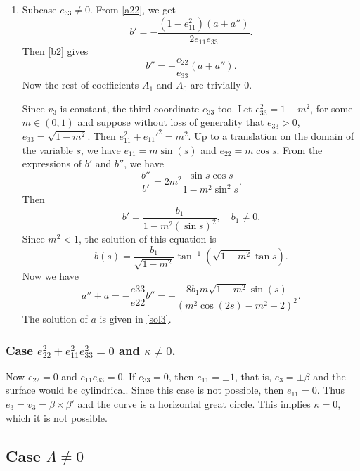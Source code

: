 \documentclass[12pt,a4paper,reqno]{amsart}
\begin{document}
\begin{enumerate}
\begin{enumerate}
\begin{enumerate}
 


\item Subcase $e_{33}\not=0$. From \eqref{a22}, we get 
$$b'=-\frac{(1-e_{11}^2)(a+a'')}{2e_{11}e_{33}}.$$
Then  \eqref{b2} gives
$$b''=-\frac{e_{22}}{e_{33}}(a+a'').$$
Now the rest of coefficients $A_1$ and $A_0$ are trivially $0$. 

Since $v_3$ is constant, the third coordinate $e_{33}$ too. Let $e_{33}^2=1-m^2$, for some $m\in (0,1)$ and suppose without loss of generality that $e_{33}>0$, $e_{33}=\sqrt{1-m^2}$. Then $e_{11}^2+e_{11}'^2=m^2$. Up to a translation on the domain of the variable $s$, we have $e_{11}=m\sin (s)$ and $e_{22}=m\cos s$. From the expressions of $b'$ and $b''$, we have
$$\frac{b''}{b'}=2m^2\frac{\sin s\cos s}{1-m^2\sin^2 s}.$$
Then 
$$b'=\frac{b_1}{1-m^2 (\sin s)^2},\quad  b_1\not=0.$$
Since $m^2<1$, the solution of this equation is  
$$b(s)=\frac{b_1}{\sqrt{1-m^2}}\tan^{-1}(\sqrt{1-m^2}\tan s).$$
Now we have 
$$a''+a=-\frac{e33}{e22}b''=-\frac{8 b_1 m \sqrt{1-m^2} \sin (s)}{\left(m^2 \cos (2 s)-m^2+2\right)^2}.$$
The solution of $a$ is given in   \eqref{sol3}. 

\end{enumerate}
 

 
\end{enumerate}
\end{enumerate}

\subsubsection{ Case $e_{22}^2+e_{11}^2e_{33}^2=0$ and $\kappa\not=0$.}

Now $e_{22}=0$ and $e_{11}e_{33}=0$. If $e_{33}=0$, then $e_{11}=\pm 1$, that is, $e_3=\pm \beta$ and the surface would be cylindrical. Since this case is not possible, then $e_{11}=0$. Thus $e_3=v_3=\beta\times\beta'$ and the curve is a horizontal great circle. This implies $\kappa=0$, which it is not possible.
 

\subsection{Case $\Lambda\not=0$}\label{s42}
\end{document}
